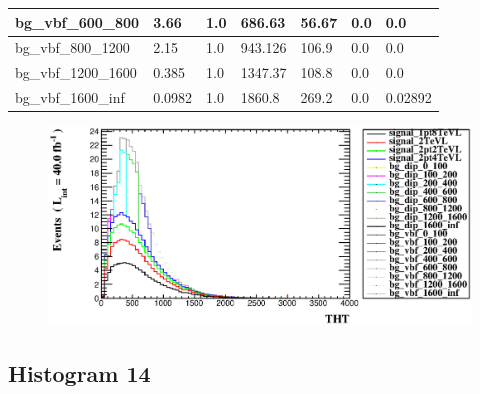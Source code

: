 \documentclass[a4paper, 10pt]{article}
\begin{document}
\begin{table}[H]
\begin{center}
\begin{tabular}{|m{23.0mm}|m{23.0mm}|m{18.0mm}|m{19.0mm}|m{19.0mm}|m{19.0mm}|m{19.0mm}|}
      \hline
      {\cellcolor{white}         bg\_vbf\_600\_800}& {\cellcolor{white}         3.66}& {\cellcolor{white}         1.0}& {\cellcolor{white}         686.63}& {\cellcolor{white}         56.67}& {\cellcolor{green}         0.0}& {\cellcolor{green}         0.0}\\
      \hline
      {\cellcolor{white}         bg\_vbf\_800\_1200}& {\cellcolor{white}         2.15}& {\cellcolor{white}         1.0}& {\cellcolor{white}         943.126}& {\cellcolor{white}         106.9}& {\cellcolor{green}         0.0}& {\cellcolor{green}         0.0}\\
      \hline
      {\cellcolor{white}         bg\_vbf\_1200\_1600}& {\cellcolor{white}         0.385}& {\cellcolor{white}         1.0}& {\cellcolor{white}         1347.37}& {\cellcolor{white}         108.8}& {\cellcolor{green}         0.0}& {\cellcolor{green}         0.0}\\
      \hline
      {\cellcolor{white}         bg\_vbf\_1600\_inf}& {\cellcolor{white}         0.0982}& {\cellcolor{white}         1.0}& {\cellcolor{white}         1860.8}& {\cellcolor{white}         269.2}& {\cellcolor{green}         0.0}& {\cellcolor{green}         0.02892}\\
\hline
    \end{tabular}
  \end{center}
\end{table}

\begin{figure}[H]
  \begin{center}
    \includegraphics[scale=0.45]{selection_12.eps}\\
\caption{   }
  \end{center}
\end{figure}
      \newpage
\subsection{ Histogram 14}
\end{document}
